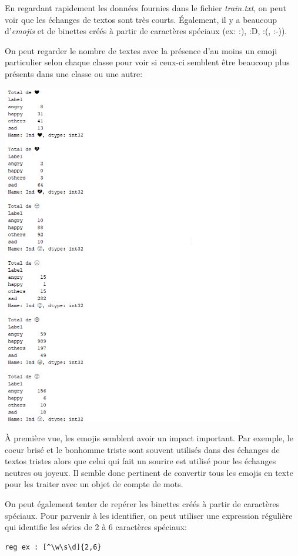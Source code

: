 En regardant rapidement les données fournies dans le fichier \emph{train.txt}, on peut voir que les échanges de textos sont très courts. Également, il y a beaucoup d'\emph{emojis} et de binettes créés à partir de caractères spéciaux (ex: :), :D, :(, :-)).

On peut regarder le nombre de textes avec la présence d'au moins un emoji particulier selon chaque classe pour voir si ceux-ci semblent être beaucoup plus présents dans une classe ou une autre:

\includegraphics[width=\linewidth,height=15cm,keepaspectratio]{images/analyse_emojis}

À première vue, les emojis semblent avoir un impact important. Par exemple, le coeur brisé et le bonhomme triste sont souvent utilisés dans des échanges de textos tristes alors que celui qui fait un sourire est utilisé pour les échanges neutres ou joyeux. Il semble donc pertinent de convertir tous les emojis en texte pour les traiter avec un objet de compte de mots.

On peut également tenter de repérer les binettes créés à partir de caractères spéciaux. Pour parvenir à les identifier, on peut utiliser une expression régulière qui identifie les séries de 2 à 6 caractères spéciaux:
\begin{verbatim}
reg ex : [^\w\s\d]{2,6}
\end{verbatim}


